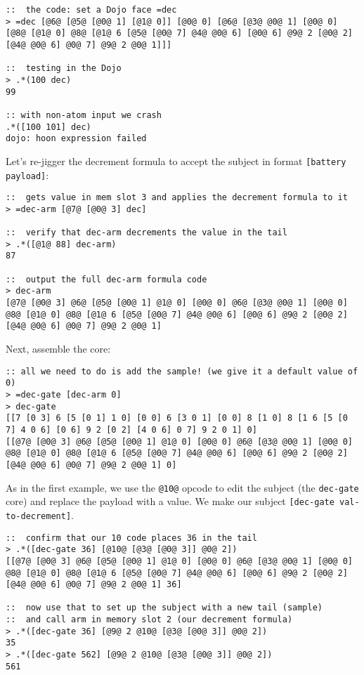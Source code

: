 \documentclass[twoside]{article}
\begin{document}
\begin{lstlisting}[style=listingcode]
::  the code: set a Dojo face =dec
> =dec [@6@ [@5@ [@0@ 1] [@1@ 0]] [@0@ 0] [@6@ [@3@ @0@ 1] [@0@ 0] [@8@ [@1@ 0] @8@ [@1@ 6 [@5@ [@0@ 7] @4@ @0@ 6] [@0@ 6] @9@ 2 [@0@ 2] [@4@ @0@ 6] @0@ 7] @9@ 2 @0@ 1]]]

::  testing in the Dojo
> .*(100 dec)
99

:: with non-atom input we crash
.*([100 101] dec)
dojo: hoon expression failed
\end{lstlisting}

Let's re-jigger the decrement formula to accept the subject in format \lstinline[style=inlinecode]{[battery payload]}:

\begin{lstlisting}[style=listingcode]
::  gets value in mem slot 3 and applies the decrement formula to it
> =dec-arm [@7@ [@0@ 3] dec]

::  verify that dec-arm decrements the value in the tail
> .*([@1@ 88] dec-arm)
87

::  output the full dec-arm formula code
> dec-arm
[@7@ [@0@ 3] @6@ [@5@ [@0@ 1] @1@ 0] [@0@ 0] @6@ [@3@ @0@ 1] [@0@ 0] @8@ [@1@ 0] @8@ [@1@ 6 [@5@ [@0@ 7] @4@ @0@ 6] [@0@ 6] @9@ 2 [@0@ 2] [@4@ @0@ 6] @0@ 7] @9@ 2 @0@ 1]
\end{lstlisting}

Next, assemble the core:

\begin{lstlisting}[style=listingcode]
:: all we need to do is add the sample! (we give it a default value of 0)
> =dec-gate [dec-arm 0]
> dec-gate
[[7 [0 3] 6 [5 [0 1] 1 0] [0 0] 6 [3 0 1] [0 0] 8 [1 0] 8 [1 6 [5 [0 7] 4 0 6] [0 6] 9 2 [0 2] [4 0 6] 0 7] 9 2 0 1] 0]
[[@7@ [@0@ 3] @6@ [@5@ [@0@ 1] @1@ 0] [@0@ 0] @6@ [@3@ @0@ 1] [@0@ 0] @8@ [@1@ 0] @8@ [@1@ 6 [@5@ [@0@ 7] @4@ @0@ 6] [@0@ 6] @9@ 2 [@0@ 2] [@4@ @0@ 6] @0@ 7] @9@ 2 @0@ 1] 0]
\end{lstlisting}

As in the first example, we use the \lstinline[style=inlinecode]{@10@} opcode to edit the subject (the \lstinline[style=inlinecode]{dec-gate} core) and replace the payload with a value.  We make our subject \lstinline[style=inlinecode]{[dec-gate val-to-decrement]}.

\begin{lstlisting}[style=listingcode]
::  confirm that our 10 code places 36 in the tail
> .*([dec-gate 36] [@10@ [@3@ [@0@ 3]] @0@ 2])
[[@7@ [@0@ 3] @6@ [@5@ [@0@ 1] @1@ 0] [@0@ 0] @6@ [@3@ @0@ 1] [@0@ 0] @8@ [@1@ 0] @8@ [@1@ 6 [@5@ [@0@ 7] @4@ @0@ 6] [@0@ 6] @9@ 2 [@0@ 2] [@4@ @0@ 6] @0@ 7] @9@ 2 @0@ 1] 36]

::  now use that to set up the subject with a new tail (sample)
::  and call arm in memory slot 2 (our decrement formula)
> .*([dec-gate 36] [@9@ 2 @10@ [@3@ [@0@ 3]] @0@ 2])
35
> .*([dec-gate 562] [@9@ 2 @10@ [@3@ [@0@ 3]] @0@ 2])
561
\end{lstlisting}
\end{document}

